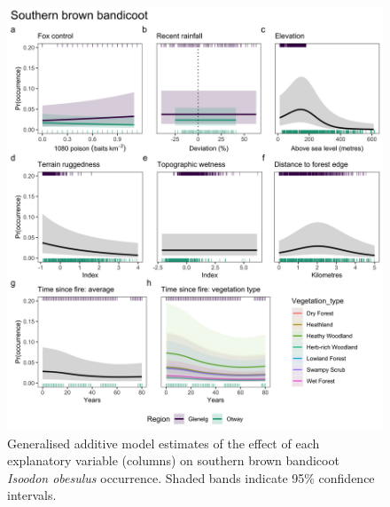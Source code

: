 \documentclass[]{elsarticle} %
\begin{document}
\newpage

\begin{figure}

{\centering \includegraphics[width=0.8\linewidth]{../figs/gams_sbb} 

}

\caption{Generalised additive model estimates of the effect of each explanatory variable (columns) on southern brown bandicoot \textit{Isoodon obesulus} occurrence. Shaded bands indicate 95\% confidence intervals.}\label{fig:gams-occ-sbb}
\end{figure}

\newpage
\end{document}
